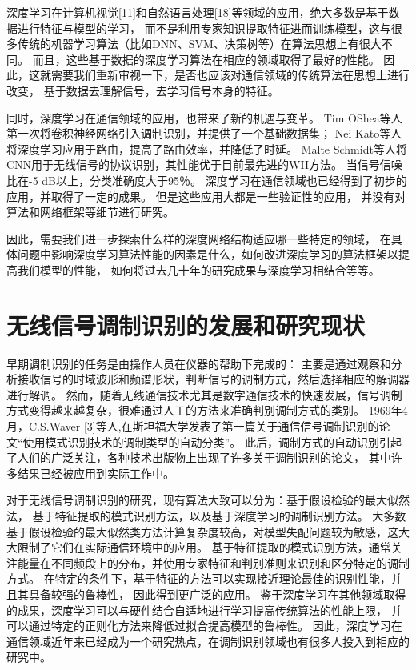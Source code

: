 深度学习在计算机视觉[11]和自然语言处理[18]等领域的应用，绝大多数是基于数据进行特征与模型的学习，
而不是利用专家知识提取特征进而训练模型，这与很多传统的机器学习算法（比如DNN、SVM、决策树等）在算法思想上有很大不同。
而且，这些基于数据的深度学习算法在相应的领域取得了最好的性能。
因此，这就需要我们重新审视一下，是否也应该对通信领域的传统算法在思想上进行改变，
基于数据去理解信号，去学习信号本身的特征。\par

同时，深度学习在通信领域的应用，也带来了新的机遇与变革。
Tim OShea等人第一次将卷积神经网络引入调制识别，并提供了一个基础数据集；
Nei Kato等人将深度学习应用于路由，提高了路由效率，并降低了时延。
Malte Schmidt等人将CNN用于无线信号的协议识别，其性能优于目前最先进的WII方法。
当信号信噪比在-5 dB以上，分类准确度大于95％。
深度学习在通信领域也已经得到了初步的应用，并取得了一定的成果。
但是这些应用大都是一些验证性的应用，
并没有对算法和网络框架等细节进行研究。\par

因此，需要我们进一步探索什么样的深度网络结构适应哪一些特定的领域，
在具体问题中影响深度学习算法性能的因素是什么，如何改进深度学习的算法框架以提高我们模型的性能，
如何将过去几十年的研究成果与深度学习相结合等等。\par

\section{无线信号调制识别的发展和研究现状}

早期调制识别的任务是由操作人员在仪器的帮助下完成的：
主要是通过观察和分析接收信号的时域波形和频谱形状，判断信号的调制方式，然后选择相应的解调器进行解调。
然而，随着无线通信技术尤其是数字通信技术的快速发展，信号调制方式变得越来越复杂，很难通过人工的方法来准确判别调制方式的类别。 
1969年4月，C.S.Waver [3]等人,在斯坦福大学发表了第一篇关于通信信号调制识别的论文“使用模式识别技术的调制类型的自动分类”。
此后，调制方式的自动识别引起了人们的广泛关注，各种技术出版物上出现了许多关于调制识别的论文，
其中许多结果已经被应用到实际工作中。 \par

对于无线信号调制识别的研究，现有算法大致可以分为：基于假设检验的最大似然法，
基于特征提取的模式识别方法，以及基于深度学习的调制识别方法。
大多数基于假设检验的最大似然类方法计算复杂度较高，对模型失配问题较为敏感，这大大限制了它们在实际通信环境中的应用。
基于特征提取的模式识别方法，通常关注能量在不同频段上的分布，并使用专家特征和判别准则来识别和区分特定的调制方式。
在特定的条件下，基于特征的方法可以实现接近理论最佳的识别性能，并且其具备较强的鲁棒性，
因此得到更广泛的应用。
鉴于深度学习在其他领域取得的成果，深度学习可以与硬件结合自适地进行学习提高传统算法的性能上限，
并可以通过特定的正则化方法来降低过拟合提高模型的鲁棒性。
因此，深度学习在通信领域近年来已经成为一个研究热点，在调制识别领域也有很多人投入到相应的研究中。\par

